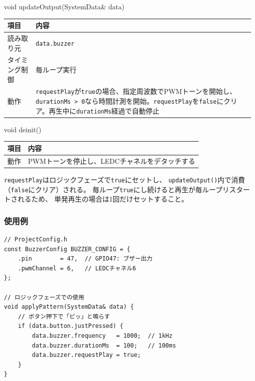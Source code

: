 \begin{funcblock}{void updateOutput(SystemData\& data)}
\begin{tabularx}{\textwidth}{l X}
\toprule
\textbf{項目} & \textbf{内容} \\
\midrule
読み取り元     & \texttt{data.buzzer} \\
タイミング制御 & 毎ループ実行 \\
動作           & \texttt{requestPlay}が\texttt{true}の場合、指定周波数でPWMトーンを開始し、\texttt{durationMs > 0}なら時間計測を開始。\texttt{requestPlay}を\texttt{false}にクリア。再生中に\texttt{durationMs}経過で自動停止 \\
\bottomrule
\end{tabularx}
\end{funcblock}

\begin{funcblock}{void deinit()}
\begin{tabularx}{\textwidth}{l X}
\toprule
\textbf{項目} & \textbf{内容} \\
\midrule
動作   & PWMトーンを停止し、LEDCチャネルをデタッチする \\
\bottomrule
\end{tabularx}
\end{funcblock}

\begin{notebox}
\texttt{requestPlay}はロジックフェーズで\texttt{true}にセットし、
\texttt{updateOutput()}内で消費（\texttt{false}にクリア）される。
毎ループ\texttt{true}にし続けると再生が毎ループリスタートされるため、
単発再生の場合は1回だけセットすること。
\end{notebox}

\subsubsection{使用例}

\begin{lstlisting}[style=cppstyle, caption={BuzzerModuleの使用例}]
// ProjectConfig.h
const BuzzerConfig BUZZER_CONFIG = {
    .pin        = 47,  // GPIO47: ブザー出力
    .pwmChannel = 6,   // LEDCチャネル6
};

// ロジックフェーズでの使用
void applyPattern(SystemData& data) {
    // ボタン押下で「ピッ」と鳴らす
    if (data.button.justPressed) {
        data.buzzer.frequency   = 1000;  // 1kHz
        data.buzzer.durationMs  = 100;   // 100ms
        data.buzzer.requestPlay = true;
    }
}
\end{lstlisting}
